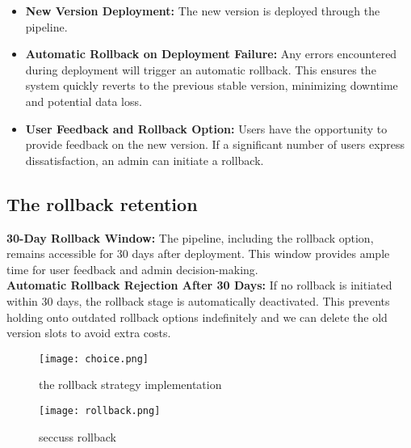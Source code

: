 \begin{itemize}
    \item \textbf{New Version Deployment:} The new version is deployed through the pipeline.
    \item \textbf{Automatic Rollback on Deployment Failure:} Any errors encountered during deployment will trigger an automatic rollback. This ensures the system quickly reverts to the previous stable version, minimizing downtime and potential data loss.
    \item \textbf{User Feedback and Rollback Option:} Users have the opportunity to provide feedback on the new version. If a significant number of users express dissatisfaction, an admin can initiate a rollback.
\end{itemize}

\subsection{The rollback retention}
\textbf{30-Day Rollback Window:}
The pipeline, including the rollback option, remains accessible for 30 days after deployment. This window provides ample time for user feedback and admin decision-making.
\\ \noindent
\textbf{Automatic Rollback Rejection After 30 Days:}
If no rollback is initiated within 30 days, the rollback stage is automatically deactivated. This prevents holding onto outdated rollback options indefinitely and we can delete the old version slots to avoid extra costs.
\\
\begin{figure}[htbp]
    \centering
    \texttt{[image: choice.png]}
    \caption{the rollback strategy implementation}
    \label{fig:rollback-strategy}
\end{figure}

\begin{figure}[htbp]
    \centering
    \texttt{[image: rollback.png]}
    \caption{seccuss rollback}
    \label{fig:rollback-seccuss}
\end{figure}

